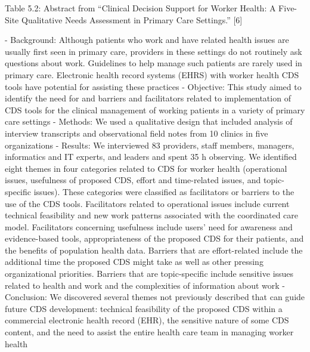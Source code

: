 Table 5.2: Abstract from “Clinical Decision Support for Worker Health: A Five-Site Qualitative Needs Assessment in Primary Care Settings.” [6]

- Background: Although patients who work and have related health issues are usually first seen in primary care, providers in these settings do not routinely ask questions about work. Guidelines to help manage such patients are rarely used in primary care. Electronic health record systems (EHRS) with worker health CDS tools have potential for assisting these practices
- Objective: This study aimed to identify the need for and barriers and facilitators related to implementation of CDS tools for the clinical management of working patients in a variety of primary care settings
- Methods: We used a qualitative design that included analysis of interview transcripts and observational field notes from 10 clinics in five organizations
- Results: We interviewed 83 providers, staff members, managers, informatics and IT experts, and leaders and spent 35 h observing. We identified eight themes in four categories related to CDS for worker health (operational issues, usefulness of proposed CDS, effort and time-related issues, and topic-specific issues). These categories were classified as facilitators or barriers to the use of the CDS tools. Facilitators related to operational issues include current technical feasibility and new work patterns associated with the coordinated care model. Facilitators concerning usefulness include users' need for awareness and evidence-based tools, appropriateness of the proposed CDS for their patients, and the benefits of population health data. Barriers that are effort-related include the additional time the proposed CDS might take as well as other pressing organizational priorities. Barriers that are topic-specific include sensitive issues related to health and work and the complexities of information about work
- Conclusion: We discovered several themes not previously described that can guide future CDS development: technical feasibility of the proposed CDS within a commercial electronic health record (EHR), the sensitive nature of some CDS content, and the need to assist the entire health care team in managing worker health

